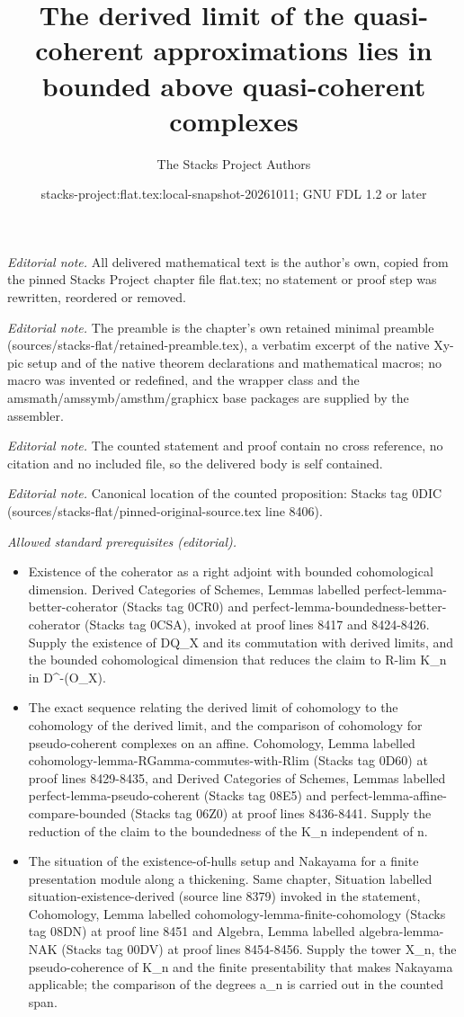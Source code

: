 \documentclass[10pt,a4paper]{amsart}
\title{The derived limit of the quasi-coherent approximations lies in bounded above quasi-coherent complexes}
\author{The Stacks Project Authors}
\date{stacks-project:flat.tex:local-snapshot-20261011; GNU FDL 1.2 or later}
\theoremstyle{plain}
\theoremstyle{definition}
\theoremstyle{remark}
\numberwithin{equation}{subsection}
\begin{document}
\maketitle
\noindent\textit{Editorial note.} All delivered mathematical text is the author's own, copied from the pinned Stacks Project chapter file flat.tex; no statement or proof step was rewritten, reordered or removed.\par\medskip
\noindent\textit{Editorial note.} The preamble is the chapter's own retained minimal preamble (sources/stacks-flat/retained-preamble.tex), a verbatim excerpt of the native Xy-pic setup and of the native theorem declarations and mathematical macros; no macro was invented or redefined, and the wrapper class and the amsmath/amssymb/amsthm/graphicx base packages are supplied by the assembler.\par\medskip
\noindent\textit{Editorial note.} The counted statement and proof contain no cross reference, no citation and no included file, so the delivered body is self contained.\par\medskip
\noindent\textit{Editorial note.} Canonical location of the counted proposition: Stacks tag 0DIC (sources/stacks-flat/pinned-original-source.tex line 8406).\par\medskip
\noindent\textit{Allowed standard prerequisites (editorial).}\begin{itemize}
\item Existence of the coherator as a right adjoint with bounded cohomological dimension. Derived Categories of Schemes, Lemmas labelled perfect-lemma-better-coherator (Stacks tag 0CR0) and perfect-lemma-boundedness-better-coherator (Stacks tag 0CSA), invoked at proof lines 8417 and 8424-8426. Supply the existence of DQ\_X and its commutation with derived limits, and the bounded cohomological dimension that reduces the claim to R-lim K\_n in D\textasciicircum{}-(O\_X).
\item The exact sequence relating the derived limit of cohomology to the cohomology of the derived limit, and the comparison of cohomology for pseudo-coherent complexes on an affine. Cohomology, Lemma labelled cohomology-lemma-RGamma-commutes-with-Rlim (Stacks tag 0D60) at proof lines 8429-8435, and Derived Categories of Schemes, Lemmas labelled perfect-lemma-pseudo-coherent (Stacks tag 08E5) and perfect-lemma-affine-compare-bounded (Stacks tag 06Z0) at proof lines 8436-8441. Supply the reduction of the claim to the boundedness of the K\_n independent of n.
\item The situation of the existence-of-hulls setup and Nakayama for a finite presentation module along a thickening. Same chapter, Situation labelled situation-existence-derived (source line 8379) invoked in the statement, Cohomology, Lemma labelled cohomology-lemma-finite-cohomology (Stacks tag 08DN) at proof line 8451 and Algebra, Lemma labelled algebra-lemma-NAK (Stacks tag 00DV) at proof lines 8454-8456. Supply the tower X\_n, the pseudo-coherence of K\_n and the finite presentability that makes Nakayama applicable; the comparison of the degrees a\_n is carried out in the counted span.
\end{itemize}\medskip
\end{document}
